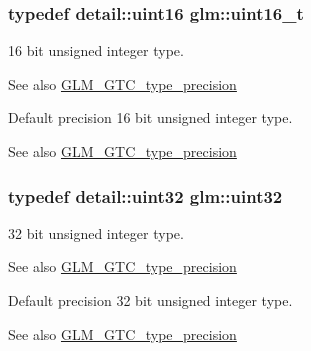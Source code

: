 \subsubsection[{\texorpdfstring{uint16\+\_\+t}{uint16_t}}]{\setlength{\rightskip}{0pt plus 5cm}typedef detail\+::uint16 {\bf glm\+::uint16\+\_\+t}}\hypertarget{group__gtc__type__precision_gac4eb4f43cae8129b00086dc234d3b8fc}{}\label{group__gtc__type__precision_gac4eb4f43cae8129b00086dc234d3b8fc}
16 bit unsigned integer type. \begin{DoxySeeAlso}{See also}
\hyperlink{group__gtc__type__precision}{G\+L\+M\+\_\+\+G\+T\+C\+\_\+type\+\_\+precision}
\end{DoxySeeAlso}
Default precision 16 bit unsigned integer type. \begin{DoxySeeAlso}{See also}
\hyperlink{group__gtc__type__precision}{G\+L\+M\+\_\+\+G\+T\+C\+\_\+type\+\_\+precision} 
\end{DoxySeeAlso}
\subsubsection[{\texorpdfstring{uint32}{uint32}}]{\setlength{\rightskip}{0pt plus 5cm}typedef detail\+::uint32 {\bf glm\+::uint32}}\hypertarget{group__gtc__type__precision_ga202b6a53c105fcb7e531f9b443518451}{}\label{group__gtc__type__precision_ga202b6a53c105fcb7e531f9b443518451}
32 bit unsigned integer type. \begin{DoxySeeAlso}{See also}
\hyperlink{group__gtc__type__precision}{G\+L\+M\+\_\+\+G\+T\+C\+\_\+type\+\_\+precision}
\end{DoxySeeAlso}
Default precision 32 bit unsigned integer type. \begin{DoxySeeAlso}{See also}
\hyperlink{group__gtc__type__precision}{G\+L\+M\+\_\+\+G\+T\+C\+\_\+type\+\_\+precision} 
\end{DoxySeeAlso}
